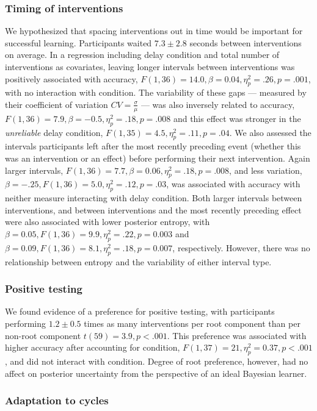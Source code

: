 \documentclass[10pt,letterpaper]{article}
\begin{document}
\subsubsection{Timing of interventions}

We hypothesized that spacing interventions out in time would be important for successful learning.  Participants waited $7.3\pm2.8$ seconds between interventions on average.  In a regression including delay condition and total number of interventions as covariates, leaving longer intervals between interventions was positively associated with accuracy, $F(1,36)=14.0, \beta = 0.04, \eta^2_p=.26, p=.001$, with no interaction with condition.  The variability of these gaps --- measured by their coefficient of variation $CV = \frac{\sigma}{\mu}$ --- was also inversely related to accuracy, $F(1,36)=7.9, \beta = -0.5, \eta^2_p=.18, p=.008$ and this effect was stronger in the \emph{unreliable} delay condition, $F(1,35) = 4.5, \eta^2_p=.11, p=.04$.  We also assessed the intervals participants left after the most recently preceding event (whether this was an intervention or an effect) before performing their next intervention.  Again larger intervals, $F(1,36)=7.7, \beta = 0.06, \eta^2_p=.18, p=.008$, and less variation, $\beta=-.25, F(1,36)=5.0, \eta^2_p=.12, p=.03$, was associated with accuracy with neither measure interacting with delay condition. 
Both larger intervals between interventions, and between interventions and the most recently preceding effect were also associated with lower posterior entropy, with $\beta=0.05, F(1,36)=9.9, \eta^2_p=.22, p=0.003$ and $\beta=0.09, F(1,36)=8.1, \eta^2_p=.18, p=0.007$, respectively.  However, there was no relationship between entropy and the variability of either interval type.

\subsubsection{Positive testing}
We found evidence of a preference for positive testing, with participants performing $1.2\pm0.5$ times as many interventions per root component than per non-root component $t(59) = 3.9, p<.001$. 
This preference was associated with higher accuracy after accounting for condition, $F(1,37) = 21, \eta^2_p = 0.37, p<.001$, and did not interact with condition.  Degree of root preference, however, had no affect on posterior uncertainty from the perspective of an ideal Bayesian learner.

\subsubsection{Adaptation to cycles}
\end{document}

